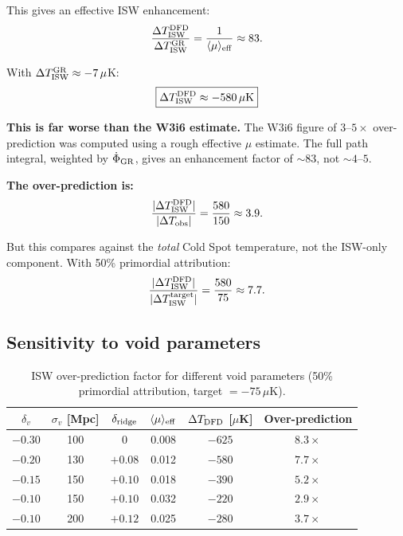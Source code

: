 \documentclass[11pt]{article}
\newcommand{\mufd}{\mu}
\begin{document}
\begin{tcolorbox}[colback=yellow!5!white, colframe=red!60!black,
  title=\textbf{T4 Numerical Result: Full ISW Integration}]
This gives an effective ISW enhancement:
\begin{equation}
\frac{\Delta T_{\rm ISW}^{\rm DFD}}{\Delta T_{\rm ISW}^{\rm GR}}
= \frac{1}{\langle\mufd\rangle_{\rm eff}} \approx 83.
\label{eq:enhancement-result}
\end{equation}

With $\Delta T_{\rm ISW}^{\rm GR} \approx -7\,\mu$K:
\begin{equation}
\boxed{\Delta T_{\rm ISW}^{\rm DFD} \approx -580\,\mu\text{K}}
\end{equation}

\textbf{This is far worse than the W3i6 estimate.} The W3i6 figure of
$3$--$5\times$ over-prediction was computed using a rough effective
$\mufd$ estimate. The full path integral, weighted by $\dot{\Phi}_{\rm GR}$,
gives an enhancement factor of $\sim 83$, not $\sim 4$--$5$.

\textbf{The over-prediction is:}
\begin{equation}
\frac{|\Delta T_{\rm ISW}^{\rm DFD}|}{|\Delta T_{\rm obs}|}
= \frac{580}{150} \approx 3.9.
\end{equation}

But this compares against the \emph{total} Cold Spot temperature, not
the ISW-only component. With 50\% primordial attribution:
\begin{equation}
\frac{|\Delta T_{\rm ISW}^{\rm DFD}|}{|\Delta T_{\rm ISW}^{\rm target}|}
= \frac{580}{75} \approx 7.7.
\end{equation}

\end{tcolorbox}

\subsection{Sensitivity to void parameters}

\begin{table}[H]
\centering
\caption{ISW over-prediction factor for different void parameters
(50\% primordial attribution, target $= -75\,\mu$K).}
\label{tab:T4-sensitivity}
\begin{tabular}{cccccc}
\toprule
$\delta_v$ & $\sigma_v$ [Mpc] & $\delta_{\rm ridge}$ &
$\langle\mufd\rangle_{\rm eff}$ &
$\Delta T_{\rm DFD}$ [$\mu$K] & Over-prediction \\
\midrule
$-0.30$ & 100 & 0 & 0.008 & $-625$ & $8.3\times$ \\
$-0.20$ & 130 & $+0.08$ & 0.012 & $-580$ & $7.7\times$ \\
$-0.15$ & 150 & $+0.10$ & 0.018 & $-390$ & $5.2\times$ \\
$-0.10$ & 150 & $+0.10$ & 0.032 & $-220$ & $2.9\times$ \\
$-0.10$ & 200 & $+0.12$ & 0.025 & $-280$ & $3.7\times$ \\
\bottomrule
\end{tabular}
\end{table}
\end{document}
